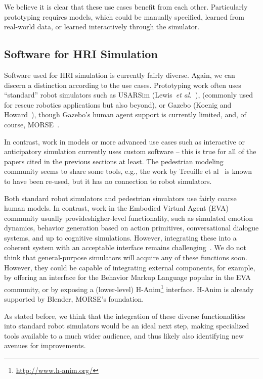 \documentclass{llncs}
\newcommand{\etal}{{\textit{et al.~}}}
\begin{document}
We believe it is clear that these use cases benefit from each other. Particularly
prototyping requires models, which could be manually specified, learned from 
real-world data, or learned interactively through the simulator.

\subsection{Software for HRI Simulation}

Software used for HRI simulation is currently fairly diverse. Again, we can
discern a distinction according to the use cases. Prototyping work often uses
``standard'' robot simulators such as USARSim (Lewis~\etal\cite{lewis2007usarsim}), 
(commonly used for rescue robotics applications but also beyond), or Gazebo 
(Koenig and Howard~\cite{Koenig2004}), though Gazebo's human agent support
is currently limited, and, of course, MORSE~\cite{morse_simpar_2012}. 

In contrast, work in models or more advanced use cases such as interactive or
anticipatory simulation currently uses custom software -- this is true for all
of the papers cited in the previous sections at least. The pedestrian modeling
community seems to share some tools, e.g., the work by Treuille et 
al~\cite{treuille2006continuum} is known to have been re-used, but it has no 
connection to robot simulators.

Both standard robot simulators and pedestrian simulators use fairly coarse 
human models. In contrast, work in the Embodied Virtual Agent (EVA) community
usually provideshigher-level functionality, such as simulated emotion dynamics, behavior
generation based on action primitives, conversational dialogue systems, and up
to cognitive simulations. However, integrating these into a coherent system with
an acceptable interface remains challenging~\cite{gratch2002creating}. We do not
think that general-purpose simulators will acquire any of these functions soon.
However, they could be capable of integrating external components, for example,
by offering an interface for the Behavior Markup Language
popular in the EVA community, or by exposing a (lower-level)
H-Anim\footnote{\url{http://www.h-anim.org/}} interface. H-Anim is already
supported by Blender, MORSE's foundation.

As stated before, we think that the integration of these diverse functionalities
into standard robot simulators would be an ideal next step, making specialized
tools available to a much wider audience, and thus likely also identifying new
avenues for improvements.
\end{document}

